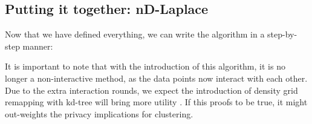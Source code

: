 
\newpage
\subsection{Putting it together: nD-Laplace}
Now that we have defined everything, we can write the algorithm in a step-by-step manner:


It is important to note that with the introduction of this algorithm, it is no longer a non-interactive method, as the data points now interact with each other.
Due to the extra interaction rounds, we expect the introduction of density grid remapping with kd-tree will bring more utility \citep{wang_comprehensive_2020, xiongComprehensiveSurveyLocal2020}.
If this proofs to be true, it might out-weights the privacy implications for clustering.


\newpage


